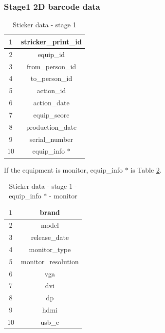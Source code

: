 \documentclass[a4paper,11pt]{article}
\begin{document}
\subsubsection {Stage1 2D barcode data}
\begin{table}[H]
	\begin{center}
		\begin{tabular}{ | c | c | }
			\hline
			1 & stricker\_print\_id \\ 
			\hline
			2 & equip\_id  \\  
			\hline
			3 & from\_person\_id \\
			\hline
			4 & to\_person\_id \\ 
			\hline
			5 &  action\_id \\  
			\hline
			6 & action\_date \\
			\hline
			7 &  equip\_score \\  
			\hline
			8 & production\_date \\
			\hline
			9 & serial\_number \\
			\hline
			10 & equip\_info $*$ \\
			\hline
		\end{tabular}
		\caption{Sticker data \-- stage 1}
		\label{table:sticker_data_stage_1}
	\end{center}
\end{table}

If the equipment is monitor, equip\_info $*$ is Table \ref{table:sticker_data_stage_1_equip_info_monitor}.
\begin{table}[h!]
	\begin{center}
		\begin{tabular}{ | c | c | }
			\hline
			1 & brand \\ 
			\hline
			2 & model  \\  
			\hline
			3 & release\_date \\
			\hline
			4 & monitor\_type \\ 
			\hline
			5 &  monitor\_resolution \\  
			\hline
			6 & vga \\
			\hline
			7 &  dvi \\  
			\hline
			8 & dp \\
			\hline
			9 & hdmi \\
			\hline
			10 & usb\_c \\  
			\hline
		\end{tabular}
		\caption{Sticker data \-- stage 1 \-- equip\_info $*$ \-- monitor}
		\label{table:sticker_data_stage_1_equip_info_monitor}
	\end{center}
\end{table}
\end{document}
